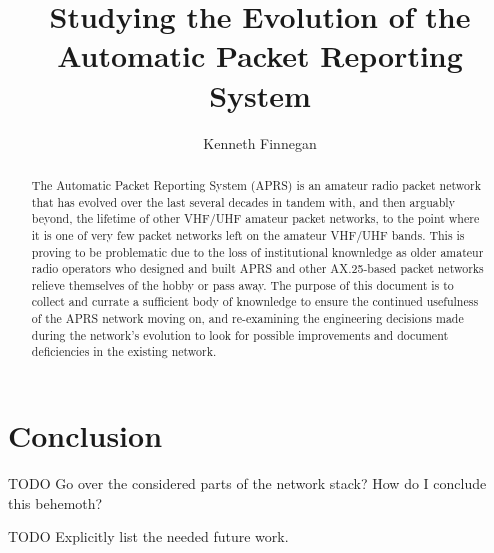 \documentclass{report}
\begin{document}
\title{Studying the Evolution of the Automatic Packet Reporting System}
\author{Kenneth Finnegan}
\maketitle

\begin{abstract}
The Automatic Packet Reporting System (APRS) is an amateur radio packet 
network that has evolved over the last several decades in tandem with, 
and then arguably beyond, the lifetime of other VHF/UHF amateur packet
networks, to the point where it is one of very few packet networks left
on the amateur VHF/UHF bands. This is proving to be problematic due to
the loss of institutional knownledge as older amateur radio operators who
designed and built APRS and other AX.25-based packet networks relieve 
themselves of the hobby or pass away. The purpose of this document is to 
collect and currate a sufficient body of knownledge to ensure the 
continued usefulness of the APRS network moving on, and re-examining 
the engineering decisions made during the network's evolution to look for
possible improvements and document deficiencies in the existing network.
\end{abstract}

\tableofcontents






\chapter{Conclusion}

TODO Go over the considered parts of the network stack? How do I conclude this
behemoth?

TODO Explicitly list the needed future work.


\end{document}
